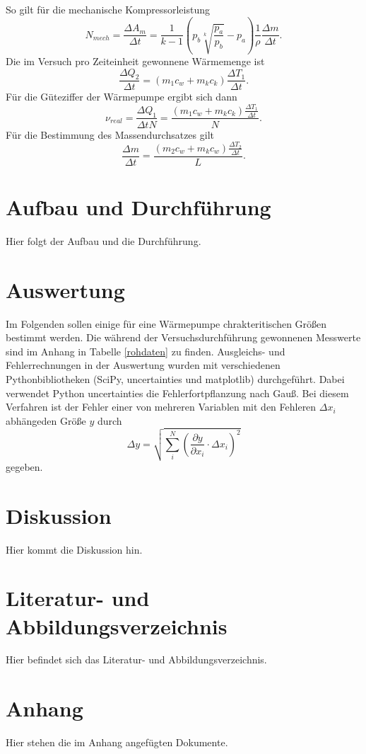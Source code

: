 \documentclass[11pt]{article}
\begin{document}
So gilt für die mechanische Kompressorleistung
\begin{equation}
\label{F7}
N_{mech} = \frac{\Delta A_m}{\Delta t} = \frac{1}{k-1} \left(p_b \sqrt[k]{\frac{p_a}{p_b}}-p_a \right) \frac{1}{\rho} \frac{\Delta m}{\Delta t}.
\end{equation}
Die im Versuch pro Zeiteinheit gewonnene Wärmemenge ist
\begin{equation}
\label{F8}
\frac{\Delta Q_2}{\Delta t} = (m_1c_w + m_kc_k) \frac{\Delta T_1}{\Delta t}.
\end{equation}
Für die Güteziffer der Wärmepumpe ergibt sich dann
\begin{equation}
\label{F9}
\nu_{real} = \frac{\Delta Q_1}{\Delta t N} = \frac{(m_1c_w + m_kc_k) \frac{\Delta T_1}{\Delta t}}{N}.
\end{equation}
Für die Bestimmung des Massendurchsatzes gilt
\begin{equation}
\label{F10}
\frac{\Delta m}{\Delta t} = \frac{(m_2 c_w + m_k c_w) \frac{\Delta T_2}{\Delta t}}{L}.
\end{equation}

\section{Aufbau und Durchf\"{u}hrung}
Hier folgt der Aufbau und die Durchführung.
\section{Auswertung}
Im Folgenden sollen einige f\"ur eine W\"armepumpe chrakteritischen Gr\"o\ss en bestimmt werden. Die w\"ahrend der Versuchsdurchf\"uhrung gewonnenen Messwerte sind im Anhang in Tabelle \ref{rohdaten} zu finden. Ausgleichs- und Fehlerrechnungen in der Auswertung wurden mit verschiedenen Pythonbibliotheken (SciPy, uncertainties und matplotlib) durchgef\"uhrt. Dabei verwendet Python uncertainties die Fehlerfortpflanzung nach Gau\ss. Bei diesem Verfahren ist der Fehler einer von mehreren Variablen mit den Fehleren $\Delta x_i$ abh\"angeden Gr\"o\ss e $y$ durch 
\begin{equation}
\Delta y = \sqrt{\sum_i^N (\frac{\partial y}{\partial x_i} \cdot \Delta x_i)^2}
\end{equation}
gegeben. 
\section{Diskussion}
Hier kommt die Diskussion hin.
\section{Literatur- und Abbildungsverzeichnis}
Hier befindet sich das Literatur- und Abbildungsverzeichnis.
\section{Anhang}
Hier stehen die im Anhang angefügten Dokumente.
\end{document}
